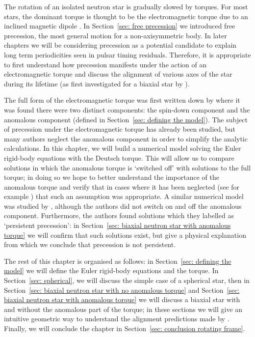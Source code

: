 \documentclass[../full_thesis/full_thesis.tex]{subfiles}
\begin{document}
The rotation of an isolated neutron star is gradually slowed by torques. For
most stars, the dominant torque is thought to be the electromagnetic torque due
to an inclined magnetic dipole \citep{Pacini1968, Gunn1969}. In
Section~\ref{sec: free precession} we introduced free precession, the most
general motion for a non-axisymmetric body. In later chapters we will be
considering precession as a potential candidate to explain long term
periodicities seen in pulsar timing residuals. Therefore, it is appropriate to
first understand how precession manifests under the action of an
electromagnetic torque and discuss the alignment of various axes of the star
during its lifetime (as first investigated for a biaxial star by
\citet{Goldreich1970}).

The full form of the
electromagnetic torque was first written down by \citet{Deutsch1955} where it
was found there were two distinct components: the spin-down component and
the anomalous component (defined in Section~\ref{sec: defining the model}). The
subject of precession under the electromagnetic torque has already been
studied, but many authors neglect the anomalous component in order to simplify
the analytic calculations. In this chapter, we will build a numerical model
solving the Euler rigid-body equations with the Deutsch torque. This will allow
us to compare solutions in which the anomalous torque is `switched off' with
solutions to the full torque; in doing so we hope to better understand the
importance of the anomalous torque and verify that in cases where it has been
neglected (see for example \citep{Goldreich1970}) that such an assumption was
appropriate. A similar numerical model was studied by \citet{Melatos2000},
although the authors did not switch on and off the anomalous component.
Furthermore, the authors found solutions which they labelled as `persistent
precession': in Section~\ref{sec: biaxial neutron star with anomalous torque} we will
confirm that such solutions exist, but give a physical explanation from which we
conclude that precession is not persistent.

The rest of this chapter is organised as follows: in Section~\ref{sec:
defining the model} we will define the Euler rigid-body equations and the
\citet{Deutsch1955} torque. In Section~\ref{sec: spherical}, we will discuss the
simple case of a spherical star, then in Section~\ref{sec: biaxial neutron star with no anomalous
torque} and Section~\ref{sec: biaxial neutron star with anomalous torque} we will discuss a
biaxial star with and without the anomalous part of the torque; in these
sections we will give an intuitive geometric way to understand the alignment
predictions made by \citet{Goldreich1970}. Finally, we will conclude the chapter
in Section~\ref{sec: conclusion rotating frame}.
\end{document}
